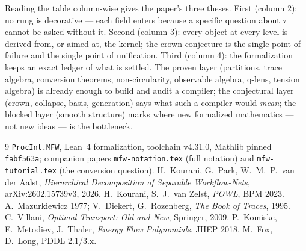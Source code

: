 \documentclass[11pt]{article}
\theoremstyle{plain}
\theoremstyle{definition}
\theoremstyle{remark}
\begin{document}
Reading the table column-wise gives the paper's three theses. First
(column 2): no rung is decorative --- each field enters because a specific
question about $\tau$ cannot be asked without it. Second (column 3): every
object at every level is derived from, or aimed at, the kernel; the crown
conjecture is the single point of failure and the single point of
unification. Third (column 4): the formalization keeps an exact ledger of
what is settled. The proven layer (partitions, trace algebra, conversion
theorems, non-circularity, observable algebra, q-lens, tension algebra) is
already enough to build and audit a compiler; the conjectural layer (crown,
collapse, basis, generation) says what such a compiler would \emph{mean};
the blocked layer (smooth structure) marks where new formalized mathematics
--- not new ideas --- is the bottleneck.

\begin{thebibliography}{9}
 \texttt{ProcInt.MFW}, Lean~4 formalization, toolchain
v4.31.0, Mathlib pinned \texttt{fabf563a}; companion papers
\texttt{mfw-notation.tex} (full notation) and \texttt{mfw-tutorial.tex}
(the conversion question).
 H.~Kourani, G.~Park, W.~M.~P.~van der Aalst,
\emph{Hierarchical Decomposition of Separable Workflow-Nets},
arXiv:2602.15739v3, 2026.
 H.~Kourani, S.~J.~van Zelst, \emph{POWL}, BPM 2023.
 A.~Mazurkiewicz 1977; V.~Diekert, G.~Rozenberg,
\emph{The Book of Traces}, 1995.
 C.~Villani, \emph{Optimal Transport: Old and New},
Springer, 2009.
 P.~Komiske, E.~Metodiev, J.~Thaler, \emph{Energy Flow
Polynomials}, JHEP 2018.
 M.~Fox, D.~Long, PDDL 2.1/3.x.
\end{thebibliography}
\end{document}
